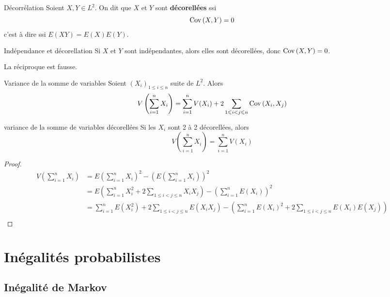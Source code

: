 \begin{definition}{Décorrélation}{}
    Soient $X, Y \in L^2$. On dit que $X$ et $Y$ sont \textbf{décorellées} ssi 
    $$ \operatorname{Cov} \,(X, Y) = 0 $$
    c'est à dire ssi $E(XY) = E(X) E(Y)$.
\end{definition}

\begin{proposition}{Indépendance et décorellation}{}
    Si $X$ et $Y$ sont indépendantes, alors elles sont décorellées, donc $\operatorname{Cov} \,(X, Y) = 0$.
\end{proposition}

\begin{remarque}
    La réciproque est fausse. 
\end{remarque}

\begin{theoreme}{Variance de la somme de variables}{}
    Soient $(X_i)_{1 \leqslant i \leqslant n}$ suite de $L^2$. Alors 
    $$ V\left( \sum_{i = 1}^n X_i \right) = \sum_{i = 1}^n V(X_i) + 2 \sum_{1 \leqslant i < j \leqslant n} \operatorname{Cov} \,(X_i, X_j) $$
\end{theoreme}

\begin{corollaire}{variance de la somme de variables décorellées}{}
    Si les $X_i$ sont 2 à 2 décorellées, alors
    $$ V\left( \sum_{i = 1}^n X_i \right) = \sum_{i = 1}^n V(X_i) $$
\end{corollaire}

\begin{proof}
    \begin{align}
        V \left( \sum_{i = 1}^n X_i \right) & = E \left( \sum_{i = 1}^n X_i \right)^2 - \left( E \left( \sum_{i = 1}^n X_i \right) \right)^2 \\
        & = E \left( \sum_{i = 1}^n X_i^2 + 2 \sum_{1 \leqslant i < j \leqslant n} X_i X_j \right) - \left( \sum_{i = 1}^n E(X_i) \right)^2 \\
        & = \sum_{i = 1}^n E(X_i^2) + 2 \sum_{1 \leqslant i < j \leqslant n} E(X_i X_j) - \left( \sum_{i = 1}^n E(X_i)^2 + 2 \sum_{1 \leqslant i < j \leqslant n} E(X_i) E(X_j) \right) \\
    \end{align}
\end{proof}

\section{Inégalités probabilistes }
\subsection{Inégalité de Markov}

